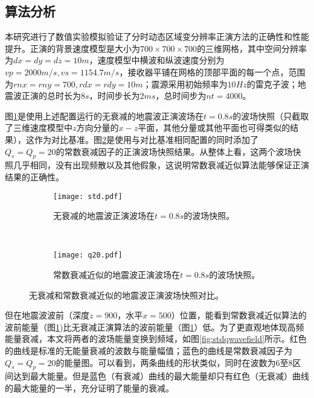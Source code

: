 \subsection{算法分析} %

本研究进行了数值实验模拟验证了分时动态区域变分辨率正演方法的正确性和性能提升。正演的背景速度模型是大小为$700\times700\times700$的三维网格，其中空间分辨率为$dx=dy=dz=10m$，速度模型中横波和纵波速度分别为$vp=2000m/s, vs=1154.7m/s$，接收器平铺在网格的顶部平面的每一个点，范围为$rnx=rny=700, rdx=rdy=10m$；震源采用初始频率为$10Hz$的雷克子波；地震波正演的总时长为$8s$，时间步长为$2ms$，总时间步为$nt=4000$。

图\ref{fig:无衰减的地震波正演波场在$t=0.8s$的波场快照。}是使用上述配置运行的无衰减的地震波正演波场在$t=0.8s$的波场快照（只截取了三维速度模型中$z$方向分量的$x-z$平面，其他分量或其他平面也可得类似的结果），这作为对比基准。图\ref{fig:常数衰减近似的地震波正演波场在$t=0.8s$的波场快照。}是使用与对比基准相同配置的同时添加了$Q_s=Q_p=20$的常数衰减因子的正演波场快照结果。从整体上看，这两个波场快照几乎相同，没有出现频散以及其他假象，这说明常数衰减近似算法能够保证正演结果的正确性。

\begin{figure}[ht]
    \centering
    \begin{subfigure}[b]{0.5\textwidth}
        \centering
        \texttt{[image: std.pdf]}
        \caption{无衰减的地震波正演波场在$t=0.8s$的波场快照。}
        \label{fig:无衰减的地震波正演波场在$t=0.8s$的波场快照。}
    \end{subfigure}%
    ~
    \begin{subfigure}[b]{0.5\textwidth}
        \centering
        \texttt{[image: q20.pdf]}
        \caption{常数衰减近似的地震波正演波场在$t=0.8s$的波场快照。}
        \label{fig:常数衰减近似的地震波正演波场在$t=0.8s$的波场快照。}
    \end{subfigure}
    \caption{无衰减和常数衰减近似的地震波正演波场快照对比。}
    \label{fig:qwavefield}
\end{figure}

但在地震波波前（深度$z=900$，水平$x=500$）位置，能看到常数衰减近似算法的波前能量（图\ref{fig:无衰减的地震波正演波场在$t=0.8s$的波场快照。})比无衰减正演算法的波前能量（图\ref{fig:无衰减的地震波正演波场在$t=0.8s$的波场快照。}）低。为了更直观地体现高频能量衰减，本文将两者的波场能量变换到频域，如图\ref{fig:stdqwavefield}所示。红色的曲线是标准的无能量衰减的波数与能量幅值；蓝色的曲线是常数衰减因子为$Q_s=Q_p=20$的能量图。可以看到，两条曲线的形状类似，同时在波数为6至8区间达到最大能量。但是蓝色（有衰减）曲线的最大能量却只有红色（无衰减）曲线的最大能量的一半，充分证明了能量的衰减。

